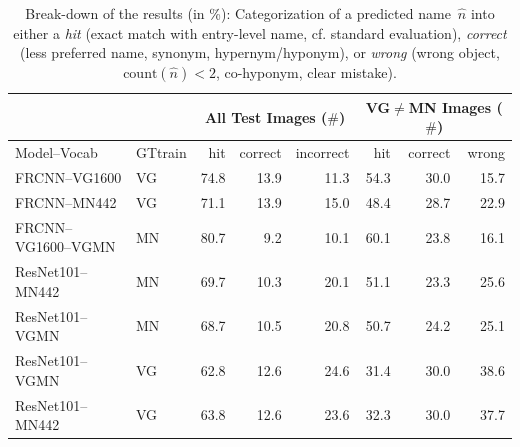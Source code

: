 \begin{table}[t]
	\centering
	\small
	\begin{tabular}{l|l|r@{~}r@{~}r@{~}||r@{~}r@{~}r@{~}}
		\toprule
		& & \multicolumn{3}{c}{All Test Images ($\#$)} 
		& \multicolumn{3}{c}{VG$\neq$MN Images ($\#$)}\\
		\toprule
		Model--Vocab	& GTtrain  
		&  hit &  correct &  incorrect &  hit &  correct &  wrong \\
		\midrule
		FRCNN--VG1600 & VG           &         74.8 &                  13.9 &                    11.3 &         54.3 &                  30.0 &                    15.7 \\
		FRCNN--MN442 & VG &         71.1 &                  13.9 &                    15.0 &         48.4 &                  28.7 &                    22.9 \\
		\midrule \midrule
		FRCNN--VG1600--VGMN & MN %
		&         80.7 &                   9.2 &                    10.1 &         60.1 &                  23.8 &                    16.1 \\
		\midrule
		ResNet101--MN442 & MN %
		&         69.7 &                  10.3 &                    20.1 &         51.1 &                  23.3 &                    25.6 \\
		ResNet101--VGMN & MN%
		&         68.7 &                  10.5 &                    20.8 &         50.7 &                  24.2 &                    25.1 \\
		ResNet101--VGMN & VG %
		&         62.8 &                  12.6 &                    24.6 &         31.4 &                  30.0 &                    38.6 \\
		ResNet101--MN442 & VG %
		&         63.8 &                  12.6 &                    23.6 &         32.3 &                  30.0 &                    37.7 \\
		\bottomrule
	\end{tabular}
	\caption{Break-down of the results (in \%): Categorization of a predicted name\ $\hat{n}$ into either a \textit{hit} (exact match with entry-level name, cf. standard evaluation), \textit{correct} (less preferred name, synonym, hypernym/hyponym), or \textit{wrong} (wrong object, $\text{count}(\hat{n})<2$, co-hyponym, clear mistake). \label{tab:exp_overview_results}}
\end{table}

